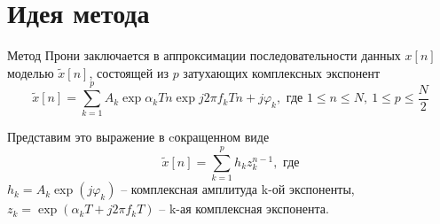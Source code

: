 \documentclass[a4paper,14pt]{extarticle}
\renewcommand*{\phi}{\varphi}
\begin{document}




        



\section{Идея метода}%
\label{sec:ideia_metoda}


Метод Прони заключается в аппроксимации последовательности данных $x[n]$
моделью $\tilde x[n]$,
состоящей из $p$ затухающих комплексных экспонент
\begin{equation}
    \tilde x[n] = \sum\limits_{k=1}^{p} A_k\exp{\alpha_k Tn} \exp{j2\pi f_k Tn
    +j\phi_k}, \text{ где } 1\leq n\leq N,~ 1\leq p \leq \frac{N}{2}
\end{equation}

Представим это выражение в cокращенном виде
\begin{equation}
    \label{eq:}
    \tilde x[n] = \sum\limits_{k=1}^{p} h_k z_{k}^{n-1}, \text{ где}
\end{equation}
    $h_k = A_k \exp(j \phi_k)$ -- комплексная амплитуда k-ой экспоненты,
    $z_k= \exp(\alpha_kT + j 2\pi f_kT)$ -- k-ая комплексная экспонента. 
\end{document}
